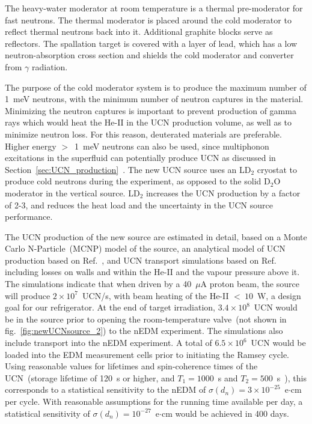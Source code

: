 The heavy-water moderator at room temperature is a thermal
pre-moderator for fast neutrons.
The thermal moderator is placed around the cold moderator
to reflect thermal neutrons back into it. Additional graphite blocks
serve as reflectors. The spallation target is covered with a layer of
lead, which has a low neutron-absorption cross section and shields the
cold moderator and converter from $\gamma$ radiation.

The purpose of the cold moderator system is to produce the maximum
number of 1~meV neutrons, with the minimum number of neutron captures
in the material. Minimizing the neutron captures is important to
prevent production of gamma rays which would heat the He-II in the UCN
production volume, as well as to minimize neutron loss. For this
reason, deuterated materials are preferable. Higher energy $>$~1~meV
neutrons can also be used, since multiphonon excitations in the
superfluid can potentially produce UCN as discussed in
Section~\ref{sec:UCN_production}~\cite{Schmidt2009,
  Korobkina2002}. The new UCN source uses an LD$_2$ cryostat to
produce cold neutrons during the experiment, as opposed to the solid
D$_2$O moderator in the vertical source. LD$_2$ increases the UCN production by
a factor of 2-3, and reduces the heat load and the uncertainty in the
UCN source performance.



The UCN production of the new source are estimated in detail, based on
a Monte Carlo N-Particle~(MCNP) model of the source, an analytical
model of UCN production based on Ref.~\cite{Korobkina2002}, and UCN
transport simulations based on Ref.~\cite{schreyer2017pentrack}
including losses on walls and within the He-II and the vapour pressure
above it.  The simulations indicate that when driven by a 40~$\mu$A
proton beam, the source will produce $2\times 10^7$~UCN/s, with beam
heating of the He-II $<~10$~W, a design goal for our refrigerator. At
the end of target irradiation, $3.4\times 10^8$~UCN would be in the
source prior to opening the room-temperature valve~(not shown in
fig.~\ref{fig:newUCNsource_2}) to the nEDM experiment.  The
simulations also include transport into the nEDM experiment. A total
of $6.5 \times 10^6$~UCN would be loaded into the EDM measurement
cells prior to initiating the Ramsey cycle. Using reasonable values
for lifetimes and spin-coherence times of the UCN~(storage lifetime of
120~s or higher, and $T_1 = 1000$~s and $T_2 = 500$~s~\cite{cdr2018}),
this corresponds to a statistical sensitivity to the nEDM of
$\sigma(d_n) = 3\times 10^{-25}$~e$\cdot$cm per cycle. With reasonable
assumptions for the running time available per day, a statistical
sensitivity of $\sigma(d_n) = 10^{-27}$~e$\cdot$cm would be achieved
in 400 days.


